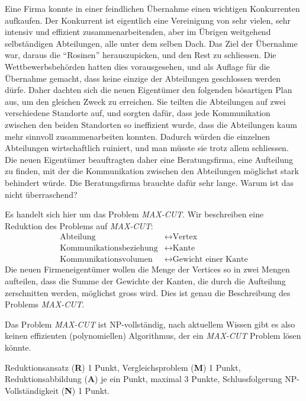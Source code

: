 Eine Firma konnte in einer feindlichen Übernahme einen wichtigen Konkurrenten
aufkaufen. Der Konkurrent ist eigentlich eine Vereinigung von sehr vielen,
sehr intensiv und effizient zusammenarbeitenden, aber im Übrigen weitgehend
selbständigen Abteilungen, alle unter dem selben Dach.
Das Ziel der Übernahme war, daraus die ``Rosinen'' herauszupicken, und
den Rest zu schliessen. Die Wettbewerbsbehörden hatten dies vorausgesehen,
und als Auflage für die Übernahme gemacht, dass keine einzige der Abteilungen
geschlossen werden dürfe.
Daher dachten sich die neuen Eigentümer den folgenden bösartigen Plan aus,
um den gleichen Zweck zu erreichen. Sie teilten die Abteilungen auf zwei 
verschiedene Standorte auf, und sorgten dafür, dass jede Kommunikation zwischen
den beiden Standorten so ineffizient wurde, dass die Abteilungen kaum mehr
sinnvoll zusammenarbeiten konnten.
Dadurch würden die einzelnen Abteilungen wirtschaftlich ruiniert, und man
müsste sie trotz allem schliessen.
Die neuen Eigentümer beauftragten daher eine Beratungsfirma, eine
Aufteilung zu finden, mit der die Kommunikation zwischen den Abteilungen
möglichst stark behindert würde.
Die Beratungsfirma brauchte dafür sehr lange. Warum ist das nicht
überraschend?


\begin{loesung}
Es handelt sich hier um das Problem \textsl{MAX-CUT}.
Wir beschreiben eine Reduktion des Problems auf \textsl{MAX-CUT}:
\begin{align*}
\text{Abteilung}&\leftrightarrow \text{Vertex} \\
\text{Kommunikationsbeziehung}&\leftrightarrow \text{Kante} \\
\text{Kommunikationsvolumen}&\leftrightarrow \text{Gewicht einer Kante}
\end{align*}
Die neuen Firmeneigentümer wollen die Menge der Vertices so in zwei
Mengen aufteilen, dass die Summe der Gewichte der Kanten, die durch die
Aufteilung zerschnitten werden, möglichst
gross wird. Dies ist genau die Beschreibung des Problems \textsl{MAX-CUT}.

Das Problem \textsl{MAX-CUT} ist NP-vollständig, nach aktuellem Wissen
gibt es also keinen effizienten (polynomiellen) Algorithmus, der ein
\textsl{MAX-CUT} Problem lösen könnte.
\end{loesung}

\begin{bewertung}
Reduktionsansatz ({\bf R}) 1 Punkt,
Vergleichsproblem ({\bf M}) 1 Punkt,
Reduktionsabbildung ({\bf A}) je ein Punkt, maximal 3 Punkte,
Schlussfolgerung NP-Vollständigkeit ({\bf N}) 1 Punkt.
\end{bewertung}

